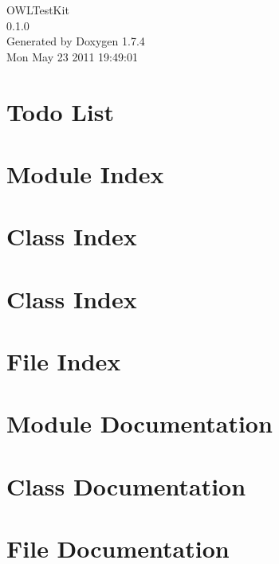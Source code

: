 \documentclass[a4paper]{book}
\begin{document}
\begin{titlepage}
\vspace*{7cm}
\begin{center}
{\Large OWLTestKit \\[1ex]\large 0.1.0 }\\
\vspace*{1cm}
{\large Generated by Doxygen 1.7.4}\\
\vspace*{0.5cm}
{\small Mon May 23 2011 19:49:01}\\
\end{center}
\end{titlepage}
\clearemptydoublepage
{}
\tableofcontents
\clearemptydoublepage
{}
\chapter{Todo List}
\label{todo}

\chapter{Module Index}

\chapter{Class Index}

\chapter{Class Index}

\chapter{File Index}

\chapter{Module Documentation}








\chapter{Class Documentation}









\chapter{File Documentation}
















\printindex
\end{document}

